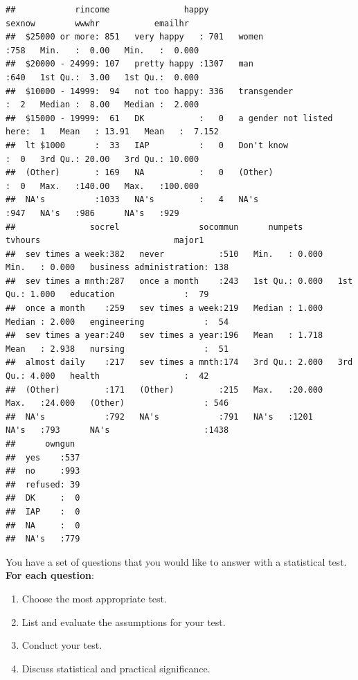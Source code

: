 \documentclass[
]{book}
\providecommand{\tightlist}{%
  \setlength{\itemsep}{0pt}\setlength{\parskip}{0pt}}
\theoremstyle{definition}
\theoremstyle{definition}
\theoremstyle{definition}
\theoremstyle{definition}
\theoremstyle{remark}
\begin{document}
\begin{verbatim}
##            rincome               happy                           sexnow        wwwhr           emailhr       
##  $25000 or more: 851   very happy   : 701   women                   :758   Min.   :  0.00   Min.   :  0.000  
##  $20000 - 24999: 107   pretty happy :1307   man                     :640   1st Qu.:  3.00   1st Qu.:  0.000  
##  $10000 - 14999:  94   not too happy: 336   transgender             :  2   Median :  8.00   Median :  2.000  
##  $15000 - 19999:  61   DK           :   0   a gender not listed here:  1   Mean   : 13.91   Mean   :  7.152  
##  lt $1000      :  33   IAP          :   0   Don't know              :  0   3rd Qu.: 20.00   3rd Qu.: 10.000  
##  (Other)       : 169   NA           :   0   (Other)                 :  0   Max.   :140.00   Max.   :100.000  
##  NA's          :1033   NA's         :   4   NA's                    :947   NA's   :986      NA's   :929      
##               socrel                socommun      numpets          tvhours                           major1    
##  sev times a week:382   never           :510   Min.   : 0.000   Min.   : 0.000   business administration: 138  
##  sev times a mnth:287   once a month    :243   1st Qu.: 0.000   1st Qu.: 1.000   education              :  79  
##  once a month    :259   sev times a week:219   Median : 1.000   Median : 2.000   engineering            :  54  
##  sev times a year:240   sev times a year:196   Mean   : 1.718   Mean   : 2.938   nursing                :  51  
##  almost daily    :217   sev times a mnth:174   3rd Qu.: 2.000   3rd Qu.: 4.000   health                 :  42  
##  (Other)         :171   (Other)         :215   Max.   :20.000   Max.   :24.000   (Other)                : 546  
##  NA's            :792   NA's            :791   NA's   :1201     NA's   :793      NA's                   :1438  
##      owngun   
##  yes    :537  
##  no     :993  
##  refused: 39  
##  DK     :  0  
##  IAP    :  0  
##  NA     :  0  
##  NA's   :779
\end{verbatim}

You have a set of questions that you would like to answer with a statistical test. \textbf{For each question}:

\begin{enumerate}
\def\labelenumi{\arabic{enumi}.}
\tightlist
\item
  Choose the most appropriate test.
\item
  List and evaluate the assumptions for your test.
\item
  Conduct your test.
\item
  Discuss statistical and practical significance.
\end{enumerate}
\end{document}
